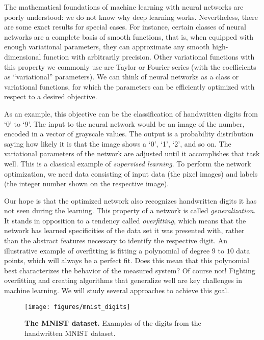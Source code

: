 The mathematical foundations of machine learning with neural networks are poorly understood: we do not know why deep learning works. Nevertheless, there are some exact results for special cases. For instance, certain classes of neural networks are a complete basis of smooth functions, that is, when equipped with enough variational parameters, they can approximate any smooth high-dimensional function with arbitrarily precision. Other variational functions with this property we commonly use are Taylor or Fourier series (with the coefficients as ``variational'' parameters). We can think of neural networks as a class or variational functions, for which the parameters can be efficiently optimized with respect to a desired objective.

As an example, this objective can be the classification of handwritten digits from `0' to `9'. The input to the neural network would be an image of the number, encoded in a vector of grayscale values. The output is a probability distribution saying how likely it is that the image shows a `0', `1', `2', and so on. The variational parameters of the network are adjusted until it accomplishes that task well. This is a classical example of \emph{supervised learning}. To perform the network optimization, we need data consisting of input data (the pixel images) and labels (the integer number shown on the respective image).

Our hope is that the optimized network also recognizes handwritten digits it has not seen during the learning. This property of a network is called \emph{generalization}. It stands in opposition to a tendency called \emph{overfitting}, which means that the network has learned specificities of the data set it was presented with, rather than the abstract features necessary to identify the respective digit. 
An illustrative example of overfitting is fitting a polynomial of degree $9$ to $10$ data points, which will always be a perfect fit. Does this mean that this polynomial best characterizes the behavior of the measured system? Of course not! 
Fighting overfitting and creating algorithms that generalize well are key challenges in machine learning. We will study several approaches to achieve this goal.

\begin{figure}
\centering
\texttt{[image: figures/mnist\_digits]}
\caption{{\bf The MNIST dataset.} Examples of the digits from the handwritten MNIST dataset.}
\label{fig:MNIST}
\end{figure}

